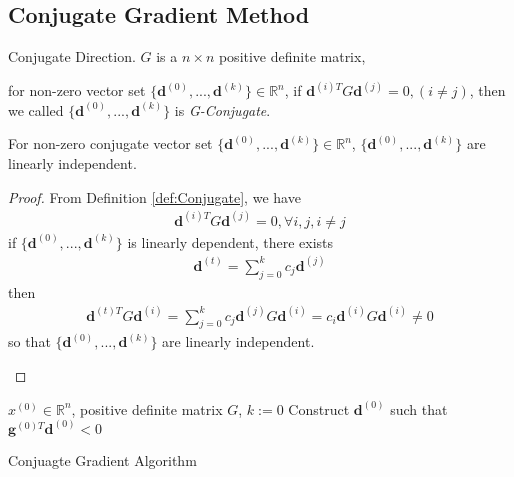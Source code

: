 \subsection{Conjugate Gradient Method}
\begin{definition}{Conjugate Direction.}
    $G$ is a $n \times n$ positive definite matrix, 
    \par\noindent for non-zero vector set
    $\{ \mathbf{d}^{(0)}, ...,\mathbf{d}^{(k)}\} \in \mathbb{R}^n$,
    if $\mathbf{d}^{(i)T} G \mathbf{d}^{(j)} = 0, (i \neq j)$,
    then we called $\{ \mathbf{d}^{(0)}, ...,\mathbf{d}^{(k)}\}$
    is \emph{G-Conjugate}.
    \label{def:Conjugate}
\end{definition}

\begin{lemma}
    For non-zero conjugate vector set 
    $\{ \mathbf{d}^{(0)}, ...,\mathbf{d}^{(k)}\} \in \mathbb{R}^n$,
    $\{ \mathbf{d}^{(0)}, ...,\mathbf{d}^{(k)}\}$ are linearly independent.
\end{lemma}
\begin{proof}
    From Definition \ref{def:Conjugate}, we have
    \begin{align}
        \mathbf{d}^{(i)T} G \mathbf{d}^{(j)} = 0, \forall i, j, i \neq j
    \end{align}
    if $\{ \mathbf{d}^{(0)}, ...,\mathbf{d}^{(k)}\}$ is linearly dependent,
    there exists 
    \begin{align}
        \mathbf{d}^{(t)} = \sum_{j=0}^k c_j \mathbf{d}^{(j)}
    \end{align} 
    then
    \begin{align}
        \mathbf{d}^{(t)T} G \mathbf{d}^{(i)} = 
        \sum_{j=0}^k c_j \mathbf{d}^{(j)} G \mathbf{d}^{(i)}
        = c_i \mathbf{d}^{(i)} G \mathbf{d}^{(i)} \neq 0
    \end{align}
    so that $\{ \mathbf{d}^{(0)}, ...,\mathbf{d}^{(k)}\}$
    are linearly independent.
    
    \label{lemma:Conjugate}
\end{proof}

\begin{algorithm}[H]
    \SetAlgoLined
     $x^{(0)} \in \mathbb{R}^n$, positive definite matrix $G$, $k:= 0$\;
     Construct $\mathbf{d}^{(0)}$ such that
     $\mathbf{g}^{(0)T}\mathbf{d}^{(0)} < 0$\;
     \caption{Conjuagte Gradient Algorithm}
\end{algorithm}

